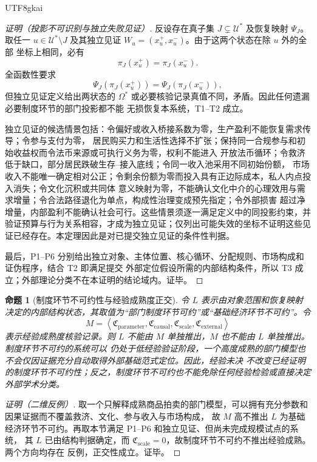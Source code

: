 \documentclass[12pt,a4paper,openany]{report}
\newtheorem{proposition}{命题}[chapter]
\newcommand{\Tuple}[1]{\left\langle #1\right\rangle}
\begin{document}
\begin{CJK*}{UTF8}{gkai}
\begin{proof}[证明（投影不可识别与独立失败见证）]
反设存在真子集 \(J\subsetneq\mathcal U^*\) 及恢复映射 \(\Psi_J\)。取任一
\(u\in\mathcal U^*\setminus J\) 及其独立见证 \(W_u=(x_u^+,x_u^-)\)。由于这两个状态在除 \(u\) 外的全部
坐标上相同，必有
\[
  \pi_J(x_u^+)=\pi_J(x_u^-).
\]
全函数性要求
\[
  \Psi_J(\pi_J(x_u^+))
  =
  \Psi_J(\pi_J(x_u^-)),
\]
但独立见证定义给出两状态的 \(\Omega^*\) 或必要核验记录真值不同，矛盾。因此任何遗漏必要制度环节的部门投影都不能
无损恢复本系统，T1--T2 成立。

独立见证的候选情景包括：令偏好或收入桥接系数为零，生产盈利不能恢复需求传导；令参与支付为零，
居民购买力和生活性选择不扩张；保持同一合规参与和初始收益权而令法币来源或可执行义务为零，权利不能进入
开放法币循环；令救济低于缺口，部分居民跌破生存--接入底线；令同一收入池采用不同初始份额，
市场收入不能唯一确定相对公正；令剩余份额为零而投入具有正边际成本，私人内点投入消失；令文化沉积或共同体
意义映射为零，不能确认文化中介的心理效用与需求增量；令合法路径退化为单点，构成性治理变成预先指定；令外部损害
超过净增量，内部盈利不能确认社会可行。这些情景须逐一满足定义中的同投影约束，并验证预算与行为关系相容，才成为独立见证；仅列出可能失效的坐标不证明这些见证已经存在。本定理因此是对已提交独立见证的条件性判据。

最后，P1--P6 分别给出独立对象、主体位置、核心循环、分配规则、市场构成和证伪程序，结合 T2 即满足提交
外部定位假设所需的内部结构条件，所以 T3 成立；外部理论分类不在本证明的结论域内。证毕。
\end{proof}

\begin{proposition}[制度环节不可约性与经验成熟度正交]
\label{prop:position-maturity-orthogonal}
令 \(L\) 表示由对象范围和恢复映射决定的内部结构状态，其取值为“部门制度环节可约”或“基础经济环节不可约”。令
\[
  M
  =\Tuple{
  \mathfrak C_{\mathrm{parameter}},
  \mathfrak C_{\mathrm{causal}},
  \mathfrak C_{\mathrm{scale}},
  \mathfrak C_{\mathrm{external}}
  }
\]
表示经验成熟度核验记录。则 \(L\) 不能由 \(M\) 单独推出，\(M\) 也不能由 \(L\) 单独推出。制度环节不可约的系统可以
仍处于低经验验证阶段，一个高度成熟的部门模型也不会仅因证据充分自动取得外部基础范式定位。因此，经验未决
不改变已经证明的制度环节不可约性；反之，制度环节不可约也不能免除任何经验检验或直接决定外部学术分类。
\end{proposition}

\begin{proof}[证明（二维反例）]
取一个只解释成熟商品拍卖的部门模型，可以拥有充分参数和因果证据而不覆盖救济、文化、参与收入与市场构成，
故 \(M\) 高不推出 \(L\) 为基础经济环节不可约。再取本节满足 P1--P6 和独立见证、但尚未完成规模试点的系统，
其 \(L\) 已由结构判据确定，而 \(\mathfrak C_{\mathrm{scale}}=0\)，故制度环节不可约不推出经验成熟。两个方向均存在
反例，正交性成立。证毕。
\end{proof}


\end{CJK*}
\end{document}
